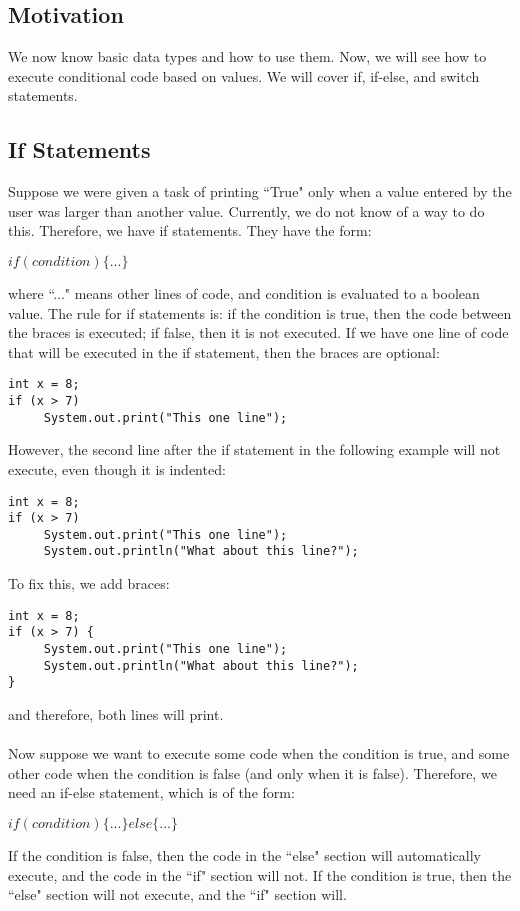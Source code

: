 

\subsection{Motivation}
We now know basic data types and how to use them. Now, we will see how to execute conditional code based on values. We will cover if, if-else, and switch statements.

\subsection{If Statements}
Suppose we were given a task of printing ``True" only when a value entered by the user was larger than another value. Currently, we do not know of a way to do this. Therefore, we have if statements. They have the form:
\begin{center}
$if(condition) \{ ... \}$
\end{center}
where ``..." means other lines of code, and condition is evaluated to a boolean value. The rule for if statements is: if the condition is true, then the code between the braces is executed; if false, then it is not executed. If we have one line of code that will be executed in the if statement, then the braces are optional:
\begin{lstlisting}
int x = 8;
if (x > 7)
     System.out.print("This one line");
\end{lstlisting}
However, the second line after the if statement in the following example will not execute, even though it is indented:
\begin{lstlisting}
int x = 8;
if (x > 7)
     System.out.print("This one line");
     System.out.println("What about this line?");
\end{lstlisting}
To fix this, we add braces:
\begin{lstlisting}
int x = 8;
if (x > 7) {
     System.out.print("This one line");
     System.out.println("What about this line?");
}
\end{lstlisting}
and therefore, both lines will print.
\\ \\
Now suppose we want to execute some code when the condition is true, and some other code when the condition is false (and only when it is false). Therefore, we need an if-else statement, which is of the form:
\begin{center}
$if(condition) \{...\} else \{...\}$
\end{center}
If the condition is false, then the code in the ``else" section will automatically execute, and the code in the ``if" section will not. If the condition is true, then the ``else" section will not execute, and the ``if" section will.
